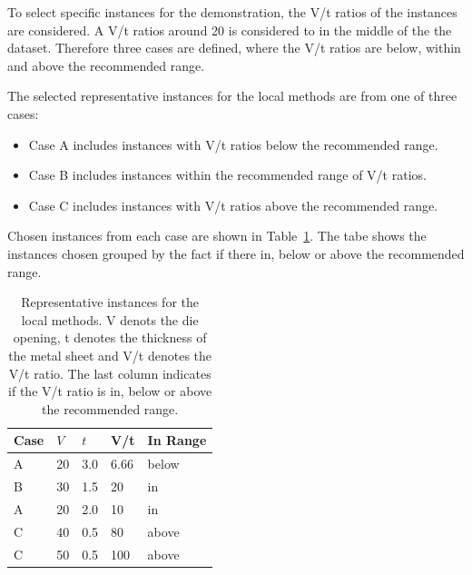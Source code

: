 To select specific instances for the demonstration, the V/t ratios of the instances are considered.
A V/t ratios around 20 is considered to in the middle of the the dataset.
Therefore three cases are defined, where the V/t ratios are below, within and above the recommended range.

The selected representative instances for the local methods are from one of three cases:
\begin{itemize}
    \item Case A includes instances with V/t ratios below the recommended range.
    \item Case B includes instances within the recommended range of V/t ratios.
    \item Case C includes instances with V/t ratios above the recommended range.
\end{itemize}

Chosen instances from each case are shown in Table~\ref{tab:representative-instances}.
The tabe shows the instances chosen grouped by the fact if there in, below or above the recommended range.

\begin{table}[H]
    \begin{tcolorbox}[arc=0pt,boxrule=0.5pt]
        \centering
        \begin{tabular}{lllll}
            \toprule
            \textbf{Case} & \textbf{\(V\) } & \textbf{\(t\)} & \textbf{V/t} & \textbf{In Range} \\
            \toprule
            A             & 20              & 3.0            & 6.66         & below             \\
            \hdashline
            B             & 30              & 1.5            & 20           & in                \\
            A             & 20              & 2.0            & 10           & in                \\
            \hdashline
            C             & 40              & 0.5            & 80           & above             \\
            C             & 50              & 0.5            & 100          & above             \\
            \bottomrule
        \end{tabular}
    \end{tcolorbox}
    \caption{Representative instances for the local methods.
    V denots the die opening, t denotes the thickness of the metal sheet and V/t denotes the V/t ratio.
    The last column indicates if the V/t ratio is in, below or above the recommended range.}
    \label{tab:representative-instances}
\end{table}

